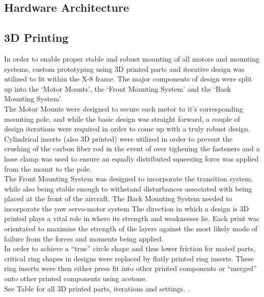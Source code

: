 \subsection{Hardware Architecture}

\subsection{3D Printing}
In order to enable proper stable and robust mounting of all motors and mounting systems, custom prototyping using 3D printed parts and iterative design was utilized to fit within the X-8 frame. The major components of design were split up into the `Motor Mounts', the `Front  Mounting System' and the `Back Mounting System'.\\
The Motor Mounts were designed to secure each motor to it's corresponding mounting pole, and while the basic design was straight forward, a couple of design iterations were required in order to come up with a truly robust design. Cylindrical inserts (also 3D printed) were utilized in order to prevent the crushing of the carbon fiber rod in the event of over tighening the fasteners and a hose clamp was used to ensure an equally distributed squeezing force was applied from the mount to the pole.\\
The Front Mounting System was designed to incorporate the transition system, while also being stable enough to withstand disturbances associated with being placed at the front of the aircraft.
The Back Mounting System needed to incorporate the yaw servo-motor system
The direction in which a design is 3D printed plays a vital role in where its strength and weaknesses lie. Each print was orientated to maximise the strength of the layers against the most likely mode of failure from the forces and moments being applied.\\
In order to achieve a ``true'' circle shape and thus lower friction for mated parts, critical ring shapes in designs were replaced by flatly printed ring inserts. These ring inserts were then either press fit into other printed components or ``merged'' onto other printed components using acetone.\\
See Table \red{[REF]} for all 3D printed parts, iterations and settings.  .

